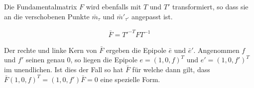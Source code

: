 Die Fundamentalmatrix $F$ wird ebenfalls mit $T$ und $T'$ transformiert, so dass sie an die verschobenen Punkte $\bar{m}_{\tau}$ und $\bar{m}'_{\tau'}$ angepasst ist.
%

\begin{gather}
	\bar{F}= T'^{-T}FT^{-1}
\end{gather}

Der rechte und linke Kern von $\bar{F}$ ergeben die Epipole $\bar{e}$ und $\bar{e}'$. Angenommen $f$ und $f'$ seinen genau 0, so liegen die Epipole $e = (1,0,f)^T$ und $e' = (1,0,f')^T$ im unendlichen. Ist dies der Fall so hat $\bar{F}$ für welche dann gilt, dass $\bar{F}(1,0,f)^T = (1,0,f')\bar{F}=0$ eine spezielle Form\cite{HZ}.








